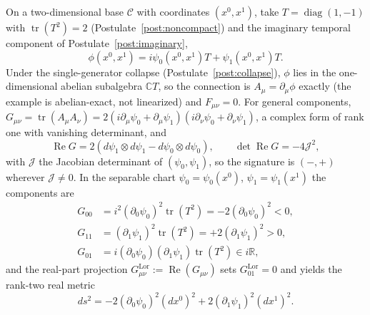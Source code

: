 \documentclass[11pt]{article}
\begin{document}
On a two-dimensional base $\mathcal{C}$ with coordinates $(x^0, x^1)$, take $T = \operatorname{diag}(1,-1)$ with $\operatorname{tr}(T^2) = 2$ (Postulate~\ref{post:noncompact}) and the imaginary temporal component of Postulate~\ref{post:imaginary},
\begin{equation}
\phi(x^0, x^1) = i\psi_0(x^0, x^1) T + \psi_1(x^0, x^1) T.
\label{eq:complex_gauge_frame}
\end{equation}
Under the single-generator collapse (Postulate~\ref{post:collapse}), $\phi$ lies in the one-dimensional abelian subalgebra $\mathbb{C}T$, so the connection is $A_\mu = \partial_\mu\phi$ exactly (the example is abelian-exact, not linearized) and $F_{\mu\nu} = 0$. For general components, $G_{\mu\nu} = \operatorname{tr}(A_\mu A_\nu) = 2(i\partial_\mu\psi_0 + \partial_\mu\psi_1)(i\partial_\nu\psi_0 + \partial_\nu\psi_1)$, a complex form of rank one with vanishing determinant, and
\begin{equation}
\operatorname{Re}G = 2\left(d\psi_1 \otimes d\psi_1 - d\psi_0 \otimes d\psi_0\right), \qquad \det \operatorname{Re}G = -4\mathcal{J}^2,
\end{equation}
with $\mathcal{J}$ the Jacobian determinant of $(\psi_0, \psi_1)$, so the signature is $(-,+)$ wherever $\mathcal{J} \neq 0$. In the separable chart $\psi_0 = \psi_0(x^0)$, $\psi_1 = \psi_1(x^1)$ the components are
\begin{align}
G_{00} &= i^2 (\partial_0 \psi_0)^2 \operatorname{tr}(T^2) = -2(\partial_0 \psi_0)^2 < 0, \\
G_{11} &= (\partial_1 \psi_1)^2 \operatorname{tr}(T^2) = +2(\partial_1 \psi_1)^2 > 0, \\
G_{01} &= i(\partial_0 \psi_0)(\partial_1 \psi_1)\operatorname{tr}(T^2) \in i\mathbb{R},
\end{align}
and the real-part projection $G^{\mathrm{Lor}}_{\mu\nu} := \operatorname{Re}(G_{\mu\nu})$ sets $G^{\mathrm{Lor}}_{01} = 0$ and yields the rank-two real metric
\begin{equation}
\boxed{ds^2 = -2(\partial_0 \psi_0)^2 (dx^0)^2 + 2(\partial_1 \psi_1)^2 (dx^1)^2 .}
\label{eq:lorentzian_metric}
\end{equation}
\end{document}
